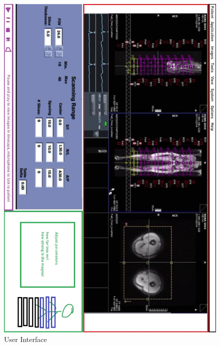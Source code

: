 \documentclass[conference]{IEEEtran}
\begin{document}
    \begin{figure}[htbp]
    \centerline{\includegraphics[scale = 0.56]{Pictures/badui.jpg}}
    \caption{User Interface}
    \label{UI}
    \end{figure}   
    
\end{document}

